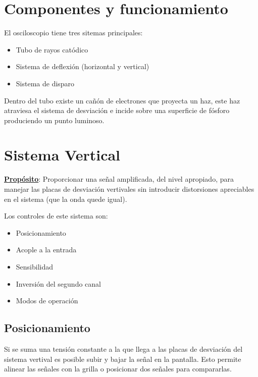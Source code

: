 \documentclass{report}
\begin{document}
\section{Componentes y funcionamiento}
El osciloscopio tiene tres sitemas principales:
\begin{itemize}
	\item Tubo de rayos catódico
	\item Sistema de deflexión (horizontal y vertical)
	\item Sistema de disparo
\end{itemize}
Dentro del tubo existe un cañón de electrones que proyecta un haz, este haz atraviesa el sistema de desviación e incide sobre una superficie de fósforo produciendo un punto luminoso.

\section{Sistema Vertical}
\textbf{\underline{Propósito}}: Proporcionar una señal amplificada, del nivel apropiado, para manejar las placas de desviación vertivales sin introducir distorsiones apreciables en el sistema (que la onda quede igual).

Los controles de este sistema son:
\begin{itemize}
	\item Posicionamiento
	\item Acople a la entrada
	\item Sensibilidad
	\item Inversión del segundo canal
	\item Modos de operación
\end{itemize}

\subsection{Posicionamiento}
Si se suma una tensión constante a la que llega a las placas de desviación del sistema vertival es posible subir y bajar la señal en la pantalla. Esto permite alinear las señales con la grilla o posicionar dos señales para compararlas.
\end{document}
